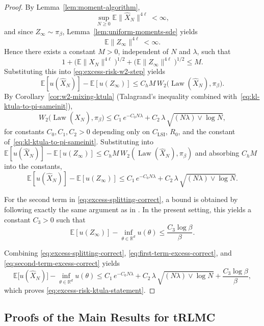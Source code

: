 \documentclass[11pt,a4paper,reqno]{amsart}
\theoremstyle{plain}
\theoremstyle{definition}
\theoremstyle{remark}
\newcommand{\R}{\mathbb{R}}
\newcommand{\E}{\mathbb{E}}
\DeclareMathOperator{\Law}{Law}
\begin{document}
\begin{proof}
By Lemma~\ref{lem:moment-algorithm},
\[
  \sup_{N\ge0}\E\|\widehat X_N\|^{4\ell}<\infty,
\]
and since \(Z_\infty\sim\pi_\beta\), Lemma~\ref{lem:uniform-moments-sde} yields
\[
  \E\|Z_\infty\|^{4\ell}<\infty.
\]
Hence there exists a constant \(M>0\), independent of \(N\) and \(\lambda\), such that
\[
  1+\bigl(\E\|\widehat X_N\|^{4\ell}\bigr)^{1/2}
  +\bigl(\E\|Z_\infty\|^{4\ell}\bigr)^{1/2}
  \le M.
\]
Substituting this into \eqref{eq:excess-risk-w2-step} yields
\[
  \E[u(\widehat X_N)]-\E[u(Z_\infty)]
  \le
  C_h M\,W_2\!\bigl(\Law(\widehat X_N),\pi_\beta\bigr).
\]
By Corollary~\ref{cor:w2-mixing-ktula} (Talagrand's inequality combined
with~\eqref{eq:kl-ktula-to-pi-sameinit}),
\[
  W_2\!\bigl(\Law(\widehat X_N),\pi_\beta\bigr)
  \le
  C_1\,e^{-C_0 N\lambda}
  +
  C_2\,\lambda\,\sqrt{(N\lambda)\vee\log N},
\]
for constants $C_0,C_1,C_2>0$ depending only on $C_{\mathrm{LSI}}$, $R_0$, and
the constant of~\eqref{eq:kl-ktula-to-pi-sameinit}. Substituting into
$\E[u(\widehat X_N)]-\E[u(Z_\infty)]\le C_h M\,W_2(\Law(\widehat X_N),\pi_\beta)$
and absorbing $C_h M$ into the constants,
\begin{equation}\label{eq:first-term-excess-correct}
  \E[u(\widehat X_N)]-\E[u(Z_\infty)]
  \le
  C_1\,e^{-C_0 N\lambda}
  +
  C_2\,\lambda\,\sqrt{(N\lambda)\vee\log N}.
\end{equation}

For the second term in \eqref{eq:excess-splitting-correct}, a bound is obtained by following exactly the
same argument as in \cite[Lemma 4.9]{lim2023nonasymptoticestimatestuslaalgorithm}. In the present
setting, this yields a constant \(C_3>0\) such that
\begin{equation}\label{eq:second-term-excess-correct}
  \E[u(Z_\infty)]-\inf_{\theta\in\R^d}u(\theta)
  \le
  \frac{C_3 \log\beta}{\beta}.
\end{equation}

Combining \eqref{eq:excess-splitting-correct}, \eqref{eq:first-term-excess-correct}, and
\eqref{eq:second-term-excess-correct} yields
\[
  \E\!\bigl[u(\widehat X_N)\bigr]-\inf_{\theta\in\R^d}u(\theta)
  \le
  C_1\,e^{-C_0N\lambda}
  +
  C_2\,\lambda\,\sqrt{(N\lambda)\vee\log N}
  +
  \frac{C_3\log\beta}{\beta},
\]
which proves \eqref{eq:excess-risk-ktula-statement}.
\end{proof}





\subsection{Proofs of the Main Results for tRLMC}
\end{document}
